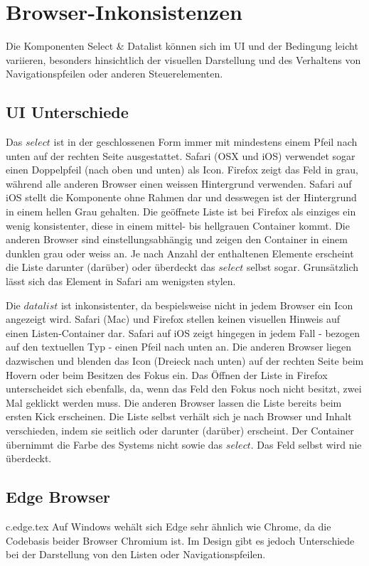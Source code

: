 \clearpage
\section{Browser-Inkonsistenzen}
Die Komponenten Select \& Datalist können sich im UI und der Bedingung leicht variieren,
besonders hinsichtlich der visuellen Darstellung und des Verhaltens von Navigationspfeilen oder anderen Steuerelementen.


\subsection{UI Unterschiede}
Das $select$ ist in der geschlossenen Form immer mit mindestens einem Pfeil nach unten auf der rechten Seite ausgestattet.
Safari (OSX und iOS) verwendet sogar einen Doppelpfeil (nach oben und unten) als Icon.
Firefox zeigt das Feld in grau, während alle anderen Browser einen weissen Hintergrund verwenden.
Safari auf iOS stellt die Komponente ohne Rahmen dar und desswegen ist der Hintergrund in einem hellen Grau gehalten.
Die geöffnete Liste ist bei Firefox als einziges ein wenig konsistenter, diese in einem mittel- bis hellgrauen Container kommt.
Die anderen Browser sind einstellungsabhängig und zeigen den Container in einem dunklen grau oder weiss an.
Je nach Anzahl der enthaltenen Elemente erscheint die Liste darunter (darüber) oder überdeckt das $select$ selbst sogar.
Grunsätzlich lässt sich das Element in Safari am wenigsten stylen.

Die $datalist$ ist inkonsistenter, da bespielsweise nicht in jedem Browser ein Icon angezeigt wird.
Safari (Mac) und Firefox stellen keinen visuellen Hinweis auf einen Listen-Container dar.
Safari auf iOS zeigt hingegen in jedem Fall - bezogen auf den textuellen Typ - einen Pfeil nach unten an.
Die anderen Browser liegen dazwischen und blenden das Icon (Dreieck nach unten) auf der rechten Seite beim Hovern oder beim Besitzen des Fokus ein.
Das Öffnen der Liste in Firefox unterscheidet sich ebenfalls, da, wenn das Feld den Fokus noch nicht besitzt, zwei Mal geklickt werden muss.
Die anderen Browser lassen die Liste bereits beim ersten Kick erscheinen.
Die Liste selbst verhält sich je nach Browser und Inhalt verschieden, indem sie seitlich oder darunter (darüber) erscheint.
Der Container übernimmt die Farbe des Systems nicht sowie das $select$.
Das Feld selbst wird nie überdeckt. 

\clearpage
\subsection{Edge Browser}
{c.edge.tex}
Auf Windows wehält sich Edge sehr ähnlich wie Chrome, da die Codebasis beider Browser Chromium ist.
Im Design gibt es jedoch Unterschiede bei der Darstellung von den Listen oder Navigationspfeilen. 

